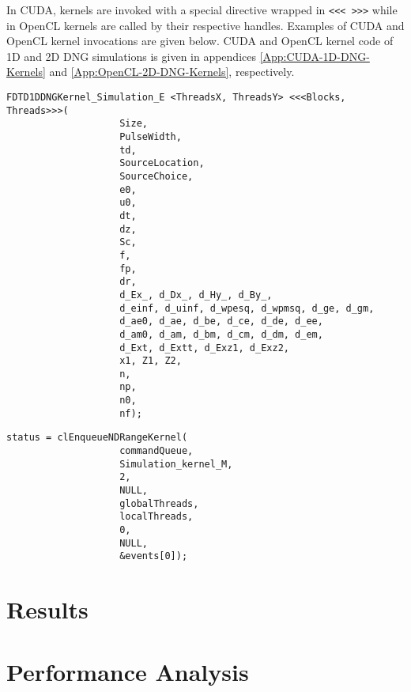 In CUDA, kernels are invoked with a special directive wrapped in \verb|<<< >>>| while in OpenCL kernels are called by their respective handles. Examples of CUDA and OpenCL kernel invocations are given below. CUDA and OpenCL kernel code of 1D and 2D DNG simulations is given in appendices \ref{App:CUDA-1D-DNG-Kernels} and \ref{App:OpenCL-2D-DNG-Kernels}, respectively.
\label{lst:CUDA-Kernel-Call}
\begin{lstlisting}[caption={CUDA Kernel Call}]
FDTD1DDNGKernel_Simulation_E <ThreadsX, ThreadsY> <<<Blocks, Threads>>>(
					Size,
					PulseWidth,
					td,
					SourceLocation,
					SourceChoice,
					e0,
					u0,
					dt,
					dz,
					Sc,
					f,
					fp,
					dr,
					d_Ex_, d_Dx_, d_Hy_, d_By_,
					d_einf, d_uinf, d_wpesq, d_wpmsq, d_ge, d_gm,
					d_ae0, d_ae, d_be, d_ce, d_de, d_ee,
					d_am0, d_am, d_bm, d_cm, d_dm, d_em,
					d_Ext, d_Extt, d_Exz1, d_Exz2,
					x1, Z1, Z2,
					n,
					np,
					n0,
					nf);
\end{lstlisting}
\label{lst:OpenCL-Kernel-Call}
\begin{lstlisting}[caption={OpenCL Kernel Call}]
status = clEnqueueNDRangeKernel(
					commandQueue,
					Simulation_kernel_M,
					2,
					NULL,
					globalThreads,
					localThreads,
					0,
					NULL,
					&events[0]);
\end{lstlisting}
\section{Results}
\section{Performance Analysis}

